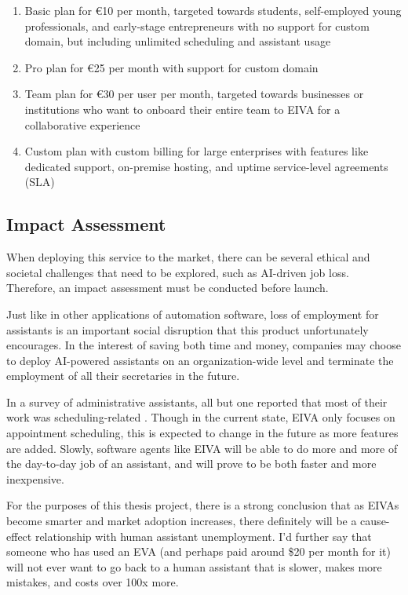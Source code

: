 \documentclass{article}
\begin{document}
\begin{enumerate}
	\item Basic plan for €10 per month, targeted towards students, self-employed young professionals, and early-stage entrepreneurs with no support for custom domain, but including unlimited scheduling and assistant usage
	\item Pro plan for €25 per month with support for custom domain
	\item Team plan for €30 per user per month, targeted towards businesses or institutions who want to onboard their entire team to EIVA for a collaborative experience
	\item Custom plan with custom billing for large enterprises with features like dedicated support, on-premise hosting, and uptime service-level agreements (SLA)
\end{enumerate}

\subsection{Impact Assessment}

When deploying this service to the market, there can be several ethical and societal challenges that need to be explored, such as AI-driven job loss. Therefore, an impact assessment must be conducted before launch.

Just like in other applications of automation software, loss of employment for assistants is an important social disruption that this product unfortunately encourages. In the interest of saving both time and money, companies may choose to deploy AI-powered assistants on an organization-wide level and terminate the employment of all their secretaries in the future.

In a survey of administrative assistants, all but one reported that most of their work was scheduling-related \cite{erickson_assistance:_2008}. Though in the current state, EIVA only focuses on appointment scheduling, this is expected to change in the future as more features are added. Slowly, software agents like EIVA will be able to do more and more of the day-to-day job of an assistant, and will prove to be both faster and more inexpensive.

For the purposes of this thesis project, there is a strong conclusion that as EIVAs become smarter and market adoption increases, there definitely will be a cause-effect relationship with human assistant unemployment. I'd further say that someone who has used an EVA (and perhaps paid around \$20 per month for it) will not ever want to go back to a human assistant that is slower, makes more mistakes, and costs over 100x more.
\end{document}
